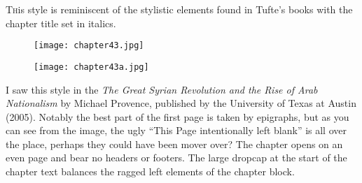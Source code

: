 \lettrine{T}his style is reminiscent of the stylistic elements found in Tufte's books with the chapter title set in italics.

\begin{figure}[ht]
\centering
\texttt{[image: chapter43.jpg]}\par
\texttt{[image: chapter43a.jpg]}
\end{figure}

I saw this style in the \textit{The Great Syrian Revolution and the Rise of Arab Nationalism} by Michael Provence, published by the University of Texas at Austin (2005). Notably the best part of the first page is taken by epigraphs, but as you can see from the image, the ugly ``This Page intentionally left blank'' is all over the place, perhaps they could have been mover over? The chapter opens on an even page and bear no headers or footers. The large dropcap at the start of the chapter text balances the ragged left elements of the chapter block.
\lipsum
